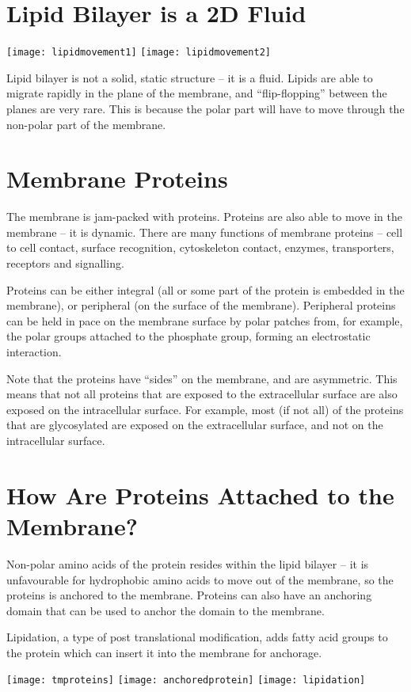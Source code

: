 \section{Lipid Bilayer is a 2D Fluid}

\begin{center}
\texttt{[image: lipidmovement1]}
\texttt{[image: lipidmovement2]}
\end{center}

Lipid bilayer is not a solid, static structure -- it is a fluid.
Lipids are able to migrate rapidly in the plane of the membrane, and ``flip-flopping'' between the planes are very rare.
This is because the polar part will have to move through the non-polar part of the membrane.

\section{Membrane Proteins}

The membrane is jam-packed with proteins.
Proteins are also able to move in the membrane -- it is dynamic.
There are many functions of membrane proteins -- cell to cell contact, surface recognition, cytoskeleton contact, enzymes, transporters, receptors and signalling.

Proteins can be either integral (all or some part of the protein is embedded in the membrane), or peripheral (on the surface of the membrane).
Peripheral proteins can be held in pace on the membrane surface by polar patches from, for example, the polar groups attached to the phosphate group, forming an electrostatic interaction.

Note that the proteins have ``sides'' on the membrane, and are asymmetric.
This means that not all proteins that are exposed to the extracellular surface are also exposed on the intracellular surface.
For example, most (if not all) of the proteins that are glycosylated are exposed on the extracellular surface, and not on the intracellular surface.

\section{How Are Proteins Attached to the Membrane?}

Non-polar amino acids of the protein resides within the lipid bilayer -- it is unfavourable for hydrophobic amino acids to move out of the membrane, so the proteins is anchored to the membrane.
Proteins can also have an anchoring domain that can be used to anchor the domain to the membrane.

Lipidation, a type of post translational modification, adds fatty acid groups to the protein which can insert it into the membrane for anchorage.

\begin{center}
\texttt{[image: tmproteins]}
\texttt{[image: anchoredprotein]}
\texttt{[image: lipidation]}
\end{center}








